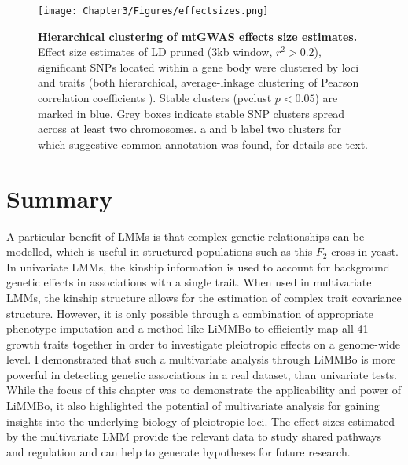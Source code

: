 \begin{figure}[hbtp]
	\centering
	\texttt{[image: Chapter3/Figures/effectsizes.png]}
	\caption[\textbf{Hierarchical clustering of mtGWAS effects size estimates.}]{\textbf{Hierarchical clustering of mtGWAS effects size estimates.} Effect size estimates of LD pruned (\num{3}kb window, \(r^2 > 0.2\)), significant SNPs located within a gene body were clustered by loci and traits (both hierarchical, average-linkage clustering of Pearson correlation coefficients ). Stable clusters (pvclust \( p < 0.05\)) are marked in blue. Grey boxes indicate stable SNP clusters spread across at least two chromosomes. a and b label two clusters for which suggestive common annotation was found, for details see text.}
 	\label{fig:effectsizes}
\end{figure}

\section{Summary}
A particular benefit of LMMs is that complex genetic relationships can be modelled, which is useful in structured populations such as this \(F_2\) cross in yeast. In univariate LMMs, the kinship information is used to account for background genetic effects in associations with a single trait. When used in multivariate LMMs, the kinship structure allows for the estimation of complex trait covariance structure. However, it is only possible through a combination of appropriate phenotype imputation and a method like LiMMBo to efficiently map all \num{41} growth traits together in order to investigate pleiotropic effects on a genome-wide level. I demonstrated that such a multivariate analysis through LiMMBo is more powerful in detecting genetic associations in a real dataset, than univariate tests. While the focus of this chapter was to demonstrate the applicability and power of  LiMMBo, it also highlighted the potential of multivariate analysis for gaining insights into the underlying biology of pleiotropic loci. The effect sizes estimated by the multivariate LMM provide the relevant data to study shared pathways and regulation and can help to generate hypotheses for future research.
